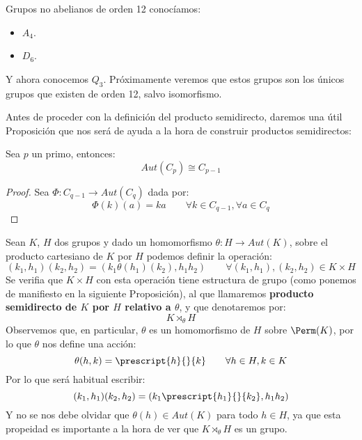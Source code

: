 \begin{ejemplo}
    Grupos no abelianos de orden 12 conocíamos:
    \begin{itemize}
        \item $A_4$.
        \item $D_6$.
    \end{itemize}
    Y ahora conocemos $Q_3$. Próximamente veremos que estos grupos son los únicos grupos que existen de orden 12, salvo isomorfismo.
\end{ejemplo}

\noindent
Antes de proceder con la definición del producto semidirecto, daremos una útil Proposición que nos será de ayuda a la hora de construir productos semidirectos:
\begin{prop}
    Sea $p$ un primo, entonces:
    \begin{equation*}
        Aut(C_p) \cong C_{p-1}
    \end{equation*}
    \begin{proof}
        Sea $\Phi:C_{q-1}\to Aut(C_q)$ dada por:
        \begin{equation*}
            \Phi(k)(a) = ka \qquad \forall k\in C_{q-1}, \forall a\in C_q
        \end{equation*}
    \end{proof}
\end{prop}

\begin{definicion}
    Sean $K$, $H$ dos grupos y dado un homomorfismo $\theta:H\to Aut(K)$, sobre el producto cartesiano de $K$ por $H$ podemos definir la operación:
    \begin{equation*}
        (k_1,h_1)(k_2,h_2) = (k_1\theta(h_1)(k_2), h_1h_2) \qquad \forall (k_1,h_1),(k_2,h_2) \in K\times H
    \end{equation*}
    Se verifia que $K\times H$ con esta operación tiene estructura de grupo (como ponemos de manifiesto en la siguiente Proposición), al que llamaremos \textbf{producto semidirecto de $K$ por $H$ relativo a $\theta$}, y que denotaremos por:
    \begin{equation*}
        K\rtimes_\theta H
    \end{equation*}
    Observemos que, en particular, $\theta$ es un homomorfismo de $H$ sobre $\Perm(K)$, por lo que $\theta$ nos define una acción:
    \begin{equation*}
        \theta(h,k) = \prescript{h}{}{k} \qquad \forall h\in H, k\in K
    \end{equation*}
    Por lo que será habitual escribir:
    \begin{equation*}
        (k_1,h_1)(k_2,h_2) = (k_1 \prescript{h_1}{}{k_2}, h_1h_2)
    \end{equation*}
    Y no se nos debe olvidar que $\theta(h) \in Aut(K)$ para todo $h\in H$, ya que esta propeidad es importante a la hora de ver que $K\rtimes_\theta H$ es un grupo.
\end{definicion}

